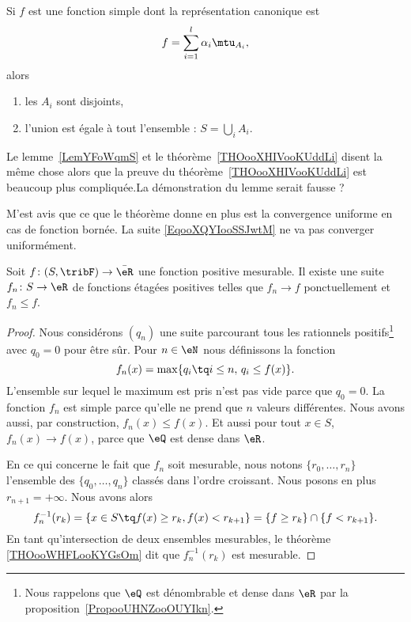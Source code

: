 \begin{lemma}   \label{LEMooNWLTooCDuRQI}
    Si \( f\) est une fonction simple dont la représentation canonique est
    \begin{equation}
        f=\sum_{i=1}^l\alpha_i\mtu_{A_i},
    \end{equation}
    alors
    \begin{enumerate}
        \item
            les \( A_i\) sont disjoints,
        \item
            l'union est égale à tout l'ensemble : \( S=\bigcup_iA_i\).
    \end{enumerate}
\end{lemma}

\begin{probleme}
    Le lemme~\ref{LemYFoWqmS} et le théorème~\ref{THOooXHIVooKUddLi} disent la même chose alors que la preuve du théorème~\ref{THOooXHIVooKUddLi} est beaucoup plus compliquée.La démonstration du lemme serait fausse ?

    M'est avis que ce que le théorème donne en plus est la convergence uniforme en cas de fonction bornée. La suite \eqref{EqooXQYIooSSJwtM} ne va pas converger uniformément.
\end{probleme}

\begin{lemma}    \label{LemYFoWqmS}
    Soit \( f\colon (S,\tribF)\to \bar\eR\) une fonction positive mesurable. Il existe une suite \( f_n\colon S\to \eR\) de fonctions étagées positives telles que \( f_n\to f\) ponctuellement et \( f_n \leq f\).
\end{lemma}

\begin{proof}
    Nous considérons \( (q_n)\) une suite parcourant tous les rationnels positifs\footnote{Nous rappelons que \( \eQ\) est dénombrable et dense dans \( \eR\) par la proposition~\ref{PropooUHNZooOUYIkn}.} avec \( q_0=0\) pour être sûr.
    Pour \( n\in \eN\) nous définissons la fonction
    \begin{equation}        \label{EqooXQYIooSSJwtM}
        f_n(x)= \max\{ q_i\tq i\leq n,\, q_i\leq f(x) \}.
    \end{equation}
    L'ensemble sur lequel le maximum est pris n'est pas vide parce que \( q_0=0\). La fonction \( f_n\) est simple parce qu'elle ne prend que \( n\) valeurs différentes. Nous avons aussi, par construction, \(  f_n(x)\leq f(x) \). Et aussi pour tout \( x\in S\), \( f_n(x)\to f(x)\), parce que \( \eQ\) est dense dans \( \eR\).

    En ce qui concerne le fait que \( f_n\) soit mesurable, nous notons \( \{ r_0,\ldots, r_{n} \}\) l'ensemble des \( \{ q_0,\ldots, q_n \}\) classés dans l'ordre croissant. Nous posons en plus \( r_{n+1}=+\infty\). Nous avons alors
    \begin{equation}
        f_n^{-1}(r_k)=\{ x\in S\tq f(x)\geq r_k,f(x)<r_{k+1} \}=\{ f\geq r_k \}\cap\{ f<r_{k+1} \}.
    \end{equation}
    En tant qu'intersection de deux ensembles mesurables, le théorème \ref{THOooWHFLooKYGsOm} dit que \( f_n^{-1}(r_k)\) est mesurable.
\end{proof}

